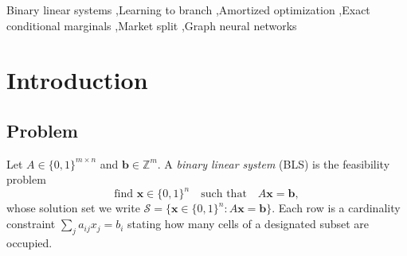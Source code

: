 \documentclass[final,5p,times,twocolumn]{elsarticle}
\newcommand{\SOL}{\mathcal{S}}
\begin{document}
\begin{frontmatter}
\begin{abstract}
We also report what the method does not achieve. CP-SAT solves the same instances $9$--$40\times$ faster at every size tested ($9$--$10\times$ at $21\times60$ after fine-tuning), and our system does not compete with it; decomposing that gap shows our branching produces $2.2\times$ \emph{fewer} nodes but processes them $32\times$ more slowly, which places the deficit in per-node cost rather than in branching quality, though we do not show that it is recoverable. And the cost advantage over probing, while asymptotically real, is only $1.3$--$1.7\times$ at the depths where prediction matters most on our instances, where probing additionally offers proofs rather than predictions. The contribution we claim is therefore methodological: exact conditional posteriors are an obtainable and well-posed supervision signal for branching, in-tree states are a better training distribution than root states --- a root-trained network is worse than relaxation rounding when deployed in the tree, an in-tree-trained one is better by $3.4$ points --- and the resulting heuristic transfers across instance size. Code, generators, exact-marginal labels and per-instance results are released.
\end{abstract}

\begin{keyword}
Binary linear systems \sep Learning to branch \sep Amortized optimization \sep Exact conditional marginals \sep Market split \sep Graph neural networks
\end{keyword}

\end{frontmatter}


\section{Introduction}
\label{sec:intro}

\subsection{Problem}

Let $A\in\{0,1\}^{m\times n}$ and $\mathbf{b}\in\mathbb{Z}^m$. A \emph{binary linear system} (BLS) is the feasibility problem
\begin{equation}
\text{find } \mathbf{x}\in\{0,1\}^n \quad\text{such that}\quad A\mathbf{x}=\mathbf{b},
\label{eq:bls}
\end{equation}
whose solution set we write $\SOL=\{\mathbf{x}\in\{0,1\}^n : A\mathbf{x}=\mathbf{b}\}$. Each row is a cardinality constraint $\sum_{j}a_{ij}x_j=b_i$ stating how many cells of a designated subset are occupied.
\end{document}
